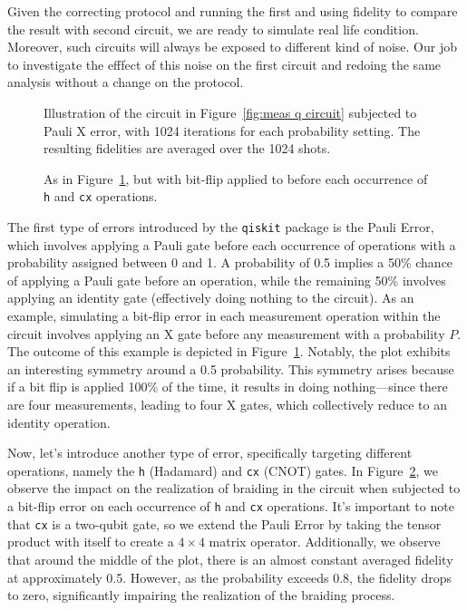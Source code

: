 \documentclass{article}
\def\c#1{\texttt{#1}}
\begin{document}
\vspace{12pt}
Given the correcting protocol and running the first and using fidelity to compare the result with second circuit, we are ready to simulate real life condition. Moreover, such circuits will always be exposed to different kind of noise. Our job to investigate the efffect of this noise on the first circuit and redoing the same analysis without a change on the protocol.
\begin{figure}
  \begin{center}
    
  \end{center}
  \caption{Illustration of the circuit in Figure~\ref{fig:meas q circuit} subjected to Pauli X error, with 1024 iterations for each probability setting. The resulting fidelities are averaged over the 1024 shots.}\label{fig:with bit flip error}
\end{figure}
\begin{figure}
  \begin{center}
    
  \end{center}
  \caption{As in Figure~\ref{fig:with bit flip error}, but with bit-flip applied to before each occurrence of \c{h} and \c{cx} operations.}\label{fig:bit flip error on cx}
\end{figure}
The first type of errors introduced by the \c{qiskit} package is the Pauli Error, which involves applying a Pauli gate before each occurrence of operations with a probability assigned between 0 and 1. A probability of 0.5 implies a 50\% chance of applying a Pauli gate before an operation, while the remaining 50\% involves applying an identity gate (effectively doing nothing to the circuit). As an example, simulating a bit-flip error in each measurement operation within the circuit involves applying an X gate before any measurement with a probability \( P \). The outcome of this example is depicted in Figure~\ref{fig:with bit flip error}. Notably, the plot exhibits an interesting symmetry around a 0.5 probability. This symmetry arises because if a bit flip is applied 100\% of the time, it results in doing nothing—since there are four measurements, leading to four X gates, which collectively reduce to an identity operation.

Now, let's introduce another type of error, specifically targeting different operations, namely the \c{h} (Hadamard) and \c{cx} (CNOT) gates. In Figure~\ref{fig:bit flip error on cx}, we observe the impact on the realization of braiding in the circuit when subjected to a bit-flip error on each occurrence of \c{h} and \c{cx} operations. It's important to note that \c{cx} is a two-qubit gate, so we extend the Pauli Error by taking the tensor product with itself to create a \(4 \times 4\) matrix operator. Additionally, we observe that around the middle of the plot, there is an almost constant averaged fidelity at approximately 0.5. However, as the probability exceeds 0.8, the fidelity drops to zero, significantly impairing the realization of the braiding process.
\end{document}
